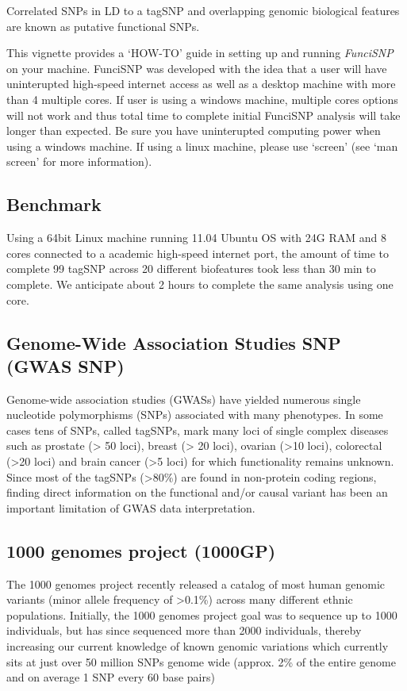\documentclass[12pt,fullpage]{article}
\newcommand{\Rpackage}[1]{{\textit{#1}}}
\begin{document}
Correlated SNPs in LD to a tagSNP and overlapping genomic biological features
are known as putative functional SNPs.

This vignette provides a `HOW-TO' guide in setting up and running
\Rpackage{FunciSNP} on your machine. FunciSNP was developed with the idea that a
user will have uninterupted high-speed internet access as well as a desktop
machine with  more than 4 multiple cores. If user is using a windows machine,
multiple cores options will not work and thus total time to complete
initial FunciSNP analysis will take longer than expected. Be sure you
have uninterupted computing power when using a windows machine. If using
a linux machine, please use `screen' (see `man screen' for more
information).

\subsection{Benchmark}
Using a 64bit Linux machine running 11.04 Ubuntu OS with 24G RAM and 8 cores
connected to a academic high-speed internet port, the amount of time to complete
99 tagSNP across 20 different biofeatures took less than 30 min to complete. We
anticipate about 2 hours to complete the same analysis using one core.

\subsection{Genome-Wide Association Studies SNP (GWAS SNP)}
Genome-wide association studies (GWASs) have yielded numerous single nucleotide
polymorphisms (SNPs) associated with many phenotypes. In some cases tens of
SNPs, called tagSNPs, mark many loci of single complex diseases such as prostate
(> 50 loci), breast (> 20 loci), ovarian (>10 loci), colorectal (>20 loci) and
brain cancer (>5 loci) for which functionality remains unknown. Since most of
the tagSNPs (>80\%) are found in non-protein coding regions, finding direct
information on the functional and/or causal variant has been an important
limitation of GWAS data interpretation.

\subsection{1000 genomes project (1000GP)}
The 1000 genomes project recently released a catalog of most human genomic
variants (minor allele frequency of >0.1\%) across many different ethnic
populations. Initially, the 1000 genomes project goal was to sequence up to 1000
individuals, but has since sequenced more than 2000 individuals, thereby
increasing our current knowledge of known genomic variations which currently
sits at just over 50 million SNPs genome wide (approx. 2\% of the entire genome
        and on average 1 SNP every 60 base pairs)
\end{document}
